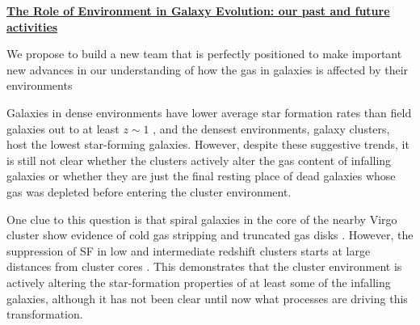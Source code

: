 \documentclass[11pt]{article}
\begin{document}
\newpage

\centerline{{\bf \underline{ The Role of Environment in Galaxy Evolution: our past and future activities}}}
\medskip


We propose to build a new team that is perfectly positioned to make important new advances in our understanding of how the gas in galaxies is affected by their environments


 Galaxies in dense environments
have lower average star formation rates than field galaxies out
to at least $z \sim 1$ \citep[e.g.][]{Poggianti99,Lewis02,Gomez03,Postman05}, and the densest environments, galaxy clusters, host the lowest star-forming galaxies. 
However, despite these suggestive trends, it is still not clear whether the clusters actively alter the gas content
of infalling galaxies or whether they are just the final resting place of
dead galaxies whose gas was depleted before entering the cluster
environment.  

One clue to this question is that spiral galaxies in the core of the nearby Virgo cluster show evidence of cold gas stripping and truncated gas disks \citep{Koopmann98,Koopmann04,Dale01,Crowl05,Chung07}.   However, the suppression of SF in low and intermediate redshift clusters starts at large distances from cluster cores \citep{Lewis02,Gomez03,Laigle17}.  This demonstrates that the cluster environment is actively altering the star-formation properties of at least some of the infalling galaxies, although it has not been clear until now what processes are driving this transformation.  
\end{document}
